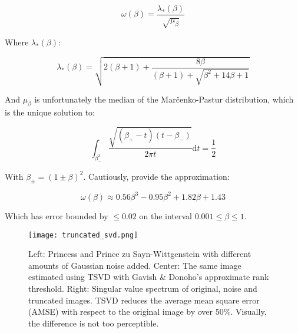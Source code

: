 \begin{equation}
\omega(\beta) = \frac{\lambda_{*}(\beta)}{\sqrt{\mu_{\beta}}}
\end{equation}

Where $\lambda_{*}(\beta)$:

\begin{equation}
\lambda_{*}(\beta) = \sqrt{2(\beta+1) + \frac{8\beta}{(\beta+1)+\sqrt{\beta^2 + 14\beta+1}}} 
\end{equation}

And $\mu_{\beta}$ is unfortunately the median of the Mar\v{c}enko-Pastur distribution, which is the unique solution to:

\begin{equation}
\int_{\beta_{-}^x}\frac{\sqrt{(\beta_{+}-t)(t-\beta_{-})}}{2\pi t} \mathrm{d}t = \frac{1}{2}
\end{equation}

With $\beta_{\pm} = (1\pm\beta)^2$. Cautiously,  provide the approximation:

\begin{equation}
\omega(\beta) \approx 0.56\beta^3 - 0.95\beta^2 + 1.82\beta + 1.43
\end{equation}

Which has error bounded by $\leq0.02$ on the interval $0.001\leq\beta \leq 1$.


\begin{figure}
\centering
    \texttt{[image: truncated\_svd.png]}
    \caption{Left: Princess and Prince zu Sayn-Wittgenstein with different amounts of Gaussian noise added. Center: The same image estimated using TSVD with Gavish \& Donoho's approximate rank threshold. Right: Singular value spectrum of original, noise and truncated images. TSVD reduces the average mean square error (AMSE) with respect to the original image by over 50\%. Visually, the difference is not too perceptible.}
    \label{fig:truncated_svd}
\end{figure}